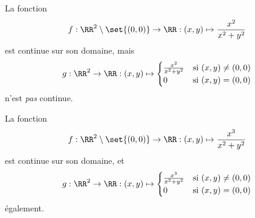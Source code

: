 \begin{frame}
  \begin{example}
    La fonction
    \begin{equation*}
      f : \RR^{2}\setminus\set{(0,0)} \to \RR : (x,y) \mapsto \frac{x^{2}}{x^{2} + y^{2}}
    \end{equation*}\pause{}
    est continue sur son domaine\pause{}, mais
    \begin{equation*}
      g : \RR^{2} \to \RR : (x,y) \mapsto
      \begin{cases}
        \frac{x^{2}}{x^{2} + y^{2}} & \text{si \((x,y)\neq (0,0)\)}\\
        0 & \text{si \((x,y) = (0,0)\)}
      \end{cases}
    \end{equation*}\pause{}
    n'est \emph{pas} continue.
  \end{example}\pause{}
  \begin{example}
    La fonction
    \begin{equation*}
      f : \RR^{2}\setminus\set{(0,0)} \to \RR : (x,y) \mapsto \frac{x^{3}}{x^{2} + y^{2}}
    \end{equation*}\pause{}
    est continue sur son domaine, et\pause{}
    \begin{equation*}
      g : \RR^{2} \to \RR : (x,y) \mapsto
      \begin{cases}
        \frac{x^{3}}{x^{2} + y^{2}} & \text{si \((x,y)\neq (0,0)\)}\\
        0 & \text{si \((x,y) = (0,0)\)}
      \end{cases}
    \end{equation*}\pause{}
    également.
  \end{example}
\end{frame}

